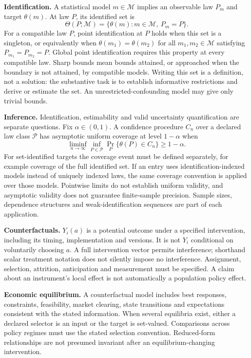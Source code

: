 \documentclass[11pt,a4paper]{article}
\begin{document}
\textbf{Identification.} A statistical model $m\in\mathcal M$ implies an observable law $P_m$ and target $\theta(m)$. At law $P$, its identified set is
\[
\Theta(P;\mathcal M)=\{\theta(m):m\in\mathcal M,\ P_m=P\}.
\]
For a compatible law $P$, point identification at $P$ holds when this set is a singleton, or equivalently when $\theta(m_1)=\theta(m_2)$ for all $m_1,m_2\in\mathcal M$ satisfying $P_{m_1}=P_{m_2}=P$. Global point identification requires this property at every compatible law. Sharp bounds mean bounds attained, or approached when the boundary is not attained, by compatible models. Writing this set is a definition, not a solution: the substantive task is to establish informative restrictions and derive or estimate the set. An unrestricted-confounding model may give only trivial bounds.

\textbf{Inference.} Identification, estimability and valid uncertainty quantification are separate questions. Fix $\alpha\in(0,1)$. A confidence procedure $C_n$ over a declared law class $\mathcal P$ has asymptotic uniform coverage at level $1-\alpha$ when
\[
\liminf_{n\to\infty}\inf_{P\in\mathcal P}\Pr_P\{\theta(P)\in C_n\}\geq1-\alpha.
\]
For set-identified targets the coverage event must be defined separately, for example coverage of the full identified set. If an entry uses identification-indexed models instead of uniquely indexed laws, the same coverage convention is applied over those models. Pointwise limits do not establish uniform validity, and asymptotic validity does not guarantee finite-sample precision. Sample sizes, dependence structures and weak-identification sequences are part of each application.

\textbf{Counterfactuals.} $Y_i(a)$ is a potential outcome under a specified intervention, including its timing, implementation and versions. It is not $Y_i$ conditional on voluntarily choosing $a$. A full intervention vector permits interference; shorthand scalar treatment notation does not silently impose no interference. Assignment, selection, attrition, anticipation and measurement must be specified. A claim about an instrument's local effect is not automatically a population policy effect.

\textbf{Economic equilibrium.} A counterfactual model includes best responses, constraints, feasibility, market clearing, state transitions and expectations consistent with the stated information. When several equilibria exist, either a declared selector is an input or the target is set-valued. Comparisons across policy regimes must use the stated selection convention. Reduced-form relationships are not presumed invariant after an equilibrium-changing intervention.
\end{document}
